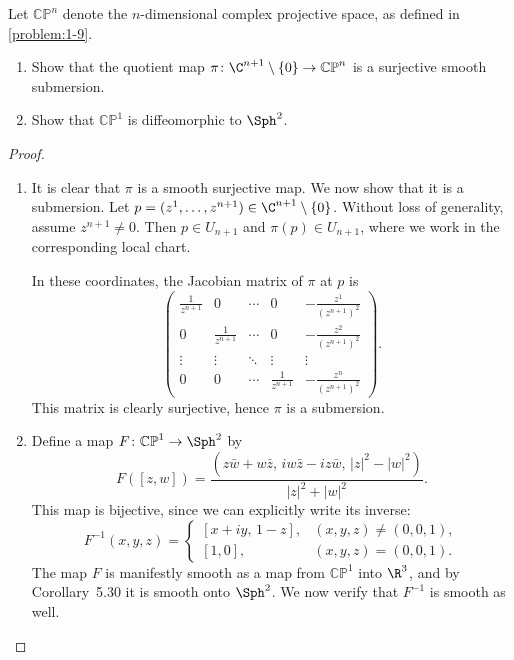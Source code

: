 \begin{problem}
    Let $\mathbb{CP}^n$ denote the $n$-dimensional complex projective space, as defined in \cref{problem:1-9}.
    \begin{enumerate}
        \item Show that the quotient map $\pi \colon \C^{n+1} \setminus \{0\} \to \mathbb{CP}^n$ is a surjective smooth submersion.
        \item Show that $\mathbb{CP}^1$ is diffeomorphic to $\Sph^2$.
    \end{enumerate}
    \begin{proof}
        \begin{enumerate}
            \item It is clear that $\pi$ is a smooth surjective map. We now show that it is a submersion. Let $p=(z^1, \dots, z^{n+1}) \in \C^{n+1} \setminus \{0\}$. Without loss of generality, assume $z^{n+1} \neq 0$. Then $p \in \widehat{U}_{n+1}$ and $\pi(p) \in U_{n+1}$, where we work in the corresponding local chart.  

            In these coordinates, the Jacobian matrix of $\pi$ at $p$ is
            \[
            \begin{pmatrix}
            \tfrac{1}{z^{n+1}} & 0 & \cdots & 0 & -\tfrac{z^1}{(z^{n+1})^2} \\
            0 & \tfrac{1}{z^{n+1}} & \cdots & 0 & -\tfrac{z^2}{(z^{n+1})^2} \\
            \vdots & \vdots & \ddots & \vdots & \vdots \\
            0 & 0 & \cdots & \tfrac{1}{z^{n+1}} & -\tfrac{z^n}{(z^{n+1})^2}
            \end{pmatrix}.
            \]
            This matrix is clearly surjective, hence $\pi$ is a submersion.

            \item Define a map $F \colon \mathbb{CP}^1 \to \Sph^2$ by
            \[
            F([z,w]) = \frac{\left(z\bar{w}+w\bar{z},\, i w\bar{z}-i z\bar{w},\, |z|^2-|w|^2\right)}{|z|^2+|w|^2}.
            \]
            This map is bijective, since we can explicitly write its inverse:
            \[
            F^{-1}(x,y,z) =
            \begin{cases}
                [x+iy,\, 1-z], & (x,y,z) \neq (0,0,1), \\[6pt]
                [1,0], & (x,y,z) = (0,0,1).
            \end{cases}
            \]
            The map $F$ is manifestly smooth as a map from $\mathbb{CP}^1$ into $\R^3$, and by Corollary~5.30 it is smooth onto $\Sph^2$. We now verify that $F^{-1}$ is smooth as well.  


\end{enumerate}
\end{proof}
\end{problem}
